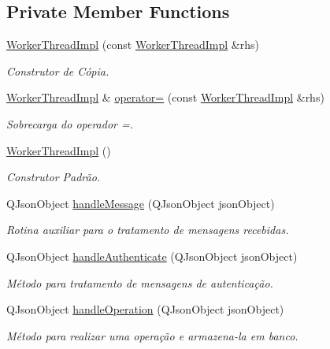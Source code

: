 \subsection*{Private Member Functions}
\begin{DoxyCompactItemize}
\item 
\hyperlink{classWorkerThreadImpl_adebf1655473918cb3ff77fbac14ca7d3}{Worker\+Thread\+Impl} (const \hyperlink{classWorkerThreadImpl}{Worker\+Thread\+Impl} \&rhs)
\begin{DoxyCompactList}\small\item\em Construtor de Cópia. \end{DoxyCompactList}\item 
\hyperlink{classWorkerThreadImpl}{Worker\+Thread\+Impl} \& \hyperlink{classWorkerThreadImpl_a6424bd714467a9cb3a38fa976501fb53}{operator=} (const \hyperlink{classWorkerThreadImpl}{Worker\+Thread\+Impl} \&rhs)
\begin{DoxyCompactList}\small\item\em Sobrecarga do operador =. \end{DoxyCompactList}\item 
\hyperlink{classWorkerThreadImpl_a6656b99702598782c9c49ee9e4437388}{Worker\+Thread\+Impl} ()
\begin{DoxyCompactList}\small\item\em Construtor Padrão. \end{DoxyCompactList}\item 
Q\+Json\+Object \hyperlink{classWorkerThreadImpl_ac1ced60fd043f7dca8a7e7e1857a91cb}{handle\+Message} (Q\+Json\+Object json\+Object)
\begin{DoxyCompactList}\small\item\em Rotina auxiliar para o tratamento de mensagens recebidas. \end{DoxyCompactList}\item 
Q\+Json\+Object \hyperlink{classWorkerThreadImpl_a72b7f275f170171a49725a508e071f71}{handle\+Authenticate} (Q\+Json\+Object json\+Object)
\begin{DoxyCompactList}\small\item\em Método para tratamento de mensagens de autenticação. \end{DoxyCompactList}\item 
Q\+Json\+Object \hyperlink{classWorkerThreadImpl_a0bcd0f706b49530ccaf7f3fc21bded7c}{handle\+Operation} (Q\+Json\+Object json\+Object)
\begin{DoxyCompactList}\small\item\em Método para realizar uma operação e armazena-\/la em banco. \end{DoxyCompactList}\item 

\end{DoxyCompactItemize}
